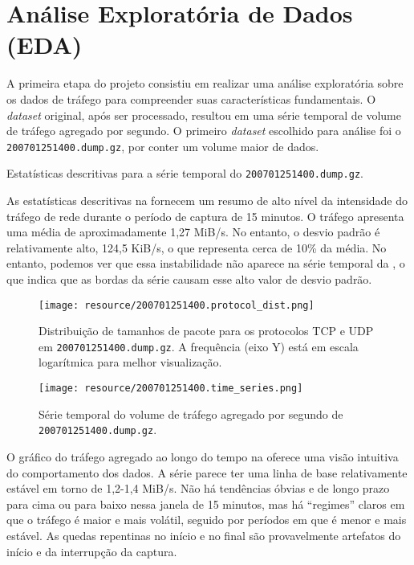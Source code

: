 \section{Análise Exploratória de Dados (EDA)}

A primeira etapa do projeto consistiu em realizar uma análise exploratória sobre os dados de tráfego para
compreender suas características fundamentais.
O \emph{dataset} original, após ser processado, resultou em uma série temporal de volume de tráfego agregado
por segundo. O primeiro \emph{dataset} escolhido para análise foi o \texttt{200701251400.dump.gz}, por conter
um volume maior de dados.

\begin{table}[!htb]
    \centering
    \caption{Estatísticas descritivas para a série temporal do \texttt{200701251400.dump.gz}.}
    \label{tab:eda-describe}
    
\end{table}

As estatísticas descritivas na  fornecem um resumo de alto nível da intensidade do
tráfego de rede durante o período de captura de 15 minutos. O tráfego apresenta uma média de aproximadamente
1,27 MiB/s. No entanto, o desvio padrão é relativamente alto, 124,5 KiB/s, o que representa cerca de 10\% da
média. No entanto, podemos ver que essa instabilidade não aparece na série temporal da
, o que indica que as bordas da série causam esse alto valor de desvio padrão.

\begin{figure}[!htb]
    \centering
    \texttt{[image: resource/200701251400.protocol\_dist.png]}
    \caption{Distribuição de tamanhos de pacote para os protocolos TCP e UDP em
        \texttt{200701251400.dump.gz}. A frequência (eixo Y) está em
    escala logarítmica para melhor visualização.}
    \label{fig:eda-protocol-dist}
\end{figure}

\begin{figure}[!htb]
    \centering
    \texttt{[image: resource/200701251400.time\_series.png]}
    \caption{Série temporal do volume de tráfego agregado por segundo de \texttt{200701251400.dump.gz}.}
    \label{fig:eda-timeseries}
\end{figure}

O gráfico do tráfego agregado ao longo do tempo na  oferece uma visão intuitiva do
comportamento dos dados. A série parece ter uma linha de base relativamente estável em torno de 1,2-1,4
MiB/s. Não há tendências óbvias e de longo prazo para cima ou para baixo nessa janela de 15 minutos, mas há
``regimes'' claros em que o tráfego é maior e mais volátil, seguido por períodos em que é menor e mais
estável. As quedas repentinas no início e no final são provavelmente artefatos do início e da interrupção da captura.

